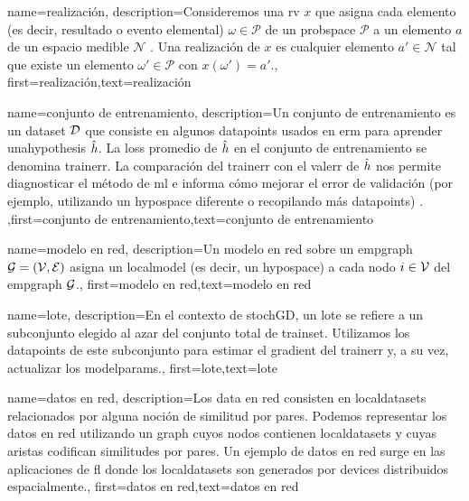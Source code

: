 	
 {name={realización},
	 description={Consideremos una \gls{rv} $x$ que asigna cada elemento 
	 (es decir, resultado o evento elemental) $\omega \in \mathcal{P}$ de un \gls{probspace} $\mathcal{P}$ 
	 a un elemento $a$ de un espacio medible $\mathcal{N}$ \cite{BillingsleyProbMeasure,RudinBookPrinciplesMatheAnalysis,HalmosMeasure}. 
	 Una realización de $x$ es cualquier elemento $a' \in \mathcal{N}$ tal que existe 
	 un elemento $\omega' \in \mathcal{P}$ con $x(\omega') = a'$.}, first={realización},text={realización}  }
 
 {name={conjunto de entrenamiento},
 description={Un conjunto de entrenamiento es un \gls{dataset} $\mathcal{D}$ que consiste en algunos \gls{datapoint}s usados en \gls{erm} 
	 para aprender una\gls{hypothesis} $\hat{h}$. La \gls{loss} promedio de $\hat{h}$ en el 
	 conjunto de entrenamiento se denomina \gls{trainerr}.  La comparación del \gls{trainerr} con el 
	 \gls{valerr} de $\hat{h}$ nos permite diagnosticar el método de \gls{ml} e informa cómo mejorar 
	 el error de validación (por ejemplo, utilizando un \gls{hypospace} diferente o recopilando más \gls{datapoint}s) \cite[Sec. 6.6]{MLBasics}.}
	 ,first={conjunto de entrenamiento},text={conjunto de entrenamiento}  
 }
 
 {name={modelo en red},
   description={Un modelo en red sobre un \gls{empgraph} $\mathcal{G} = \left( \mathcal{V},\mathcal{E} \right)$ asigna 
	un \gls{localmodel} (es decir, un \gls{hypospace}) a cada nodo $i \in \mathcal{V}$ del \gls{empgraph} $\mathcal{G}$.}, 
	first={modelo en red},text={modelo en red}
 }

 {
	 name={lote},
	 description={En el contexto de \gls{stochGD}, un lote se refiere a un subconjunto elegido al azar del 
	 conjunto total de \gls{trainset}. Utilizamos los \gls{datapoint}s de este subconjunto 
	 para estimar el \gls{gradient} del \gls{trainerr} y, a su vez, actualizar los \gls{modelparams}.}, 
	 first={lote},text={lote}  
 }
 
 {
	 name={datos en red},
	 description={Los \gls{data} en red consisten en \gls{localdataset}s 
	 relacionados por alguna noción de similitud por pares. Podemos representar los datos en red 
	 utilizando un \gls{graph} cuyos nodos contienen \gls{localdataset}s y cuyas aristas codifican 
	 similitudes por pares. Un ejemplo de datos en red surge en las aplicaciones de \gls{fl} 
	 donde los \gls{localdataset}s  son generados por \gls{device}s distribuidos espacialmente.}, 
	 first={datos en red},text={datos en red}  
 }
 
